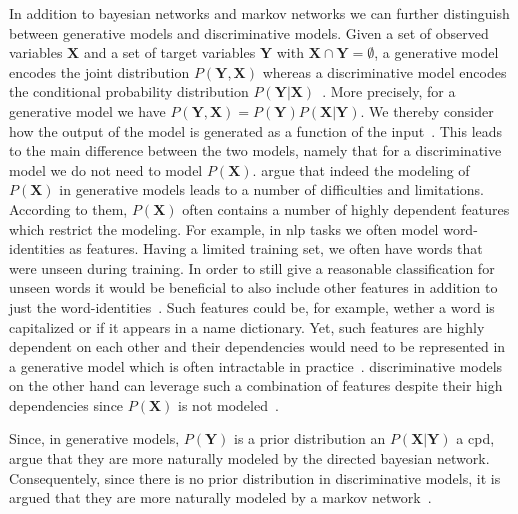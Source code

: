 \bigskip

In addition to \glspl{bayesian network} and \glspl{markov network} we can further distinguish between \glspl{generative model} and \glspl{discriminative model}.
Given a set of \glspl{observed variable} $\mathbf{X}$ and a set of \glspl{target variable} $\mathbf{Y}$ with $\mathbf{X}\cap\mathbf{Y}=\emptyset$, a \gls{generative model} encodes the \gls{joint distribution} $P(\mathbf{Y},\mathbf{X})$ whereas a \gls{discriminative model} encodes the \gls{conditional probability distribution} $P(\mathbf{Y}|\mathbf{X})$~\citep{koller2009probabilistic}.
More precisely, for a \gls{generative model} we have $P(\mathbf{Y},\mathbf{X})=P(\mathbf{Y})P(\mathbf{X}|\mathbf{Y})$.
We thereby consider how the output of the model is generated as a function of the input~\citep{sutton2010introduction}.
This leads to the main difference between the two models, namely that for a \gls{discriminative model} we do not need to model $P(\mathbf{X})$.
\citet{sutton2010introduction} argue that indeed the modeling of $P(\mathbf{X})$ in \glspl{generative model} leads to a number of difficulties and limitations.
According to them, $P(\mathbf{X})$ often contains a number of highly dependent features which restrict the modeling.
For example, in \gls{nlp} tasks we often model word-identities as features.
Having a limited training set, we often have words that were unseen during training.
In order to still give a reasonable classification for unseen words it would be beneficial to also include other features in addition to just the word-identities~\citep{sutton2010introduction}.
Such features could be, for example, wether a word is capitalized or if it appears in a name dictionary.
Yet, such features are highly dependent on each other and their dependencies would need to be represented in a \gls{generative model} which is often intractable in practice~\citep{sutton2010introduction}.
\Glspl{discriminative model} on the other hand can leverage such a combination of features despite their high dependencies since $P(\mathbf{X})$ is not modeled~\citep{koller2009probabilistic}.

Since, in \glspl{generative model}, $P(\mathbf{Y})$ is a \gls{prior distribution} an $P(\mathbf{X}|\mathbf{Y})$ a \gls{cpd}, \citet{sutton2010introduction} argue that they are more naturally modeled by the directed \gls{bayesian network}.
Consequentely, since there is no \gls{prior distribution} in \glspl{discriminative model}, it is argued that they are more naturally modeled by a \gls{markov network}~\citep{sutton2010introduction}.

